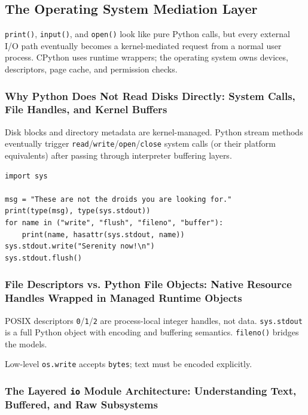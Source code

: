 \subsection{The Operating System Mediation Layer}

\texttt{print()}, \texttt{input()}, and \texttt{open()} look like pure Python calls, but every external I/O path eventually becomes a kernel-mediated request from a normal user process. CPython uses runtime wrappers; the operating system owns devices, descriptors, page cache, and permission checks.

\subsubsection{Why Python Does Not Read Disks Directly: System Calls, File Handles, and Kernel Buffers}

Disk blocks and directory metadata are kernel-managed. Python stream methods eventually trigger \texttt{read}/\texttt{write}/\texttt{open}/\texttt{close} system calls (or their platform equivalents) after passing through interpreter buffering layers.

\begin{verbatim}
import sys

msg = "These are not the droids you are looking for."
print(type(msg), type(sys.stdout))
for name in ("write", "flush", "fileno", "buffer"):
    print(name, hasattr(sys.stdout, name))
sys.stdout.write("Serenity now!\n")
sys.stdout.flush()
\end{verbatim}

\subsubsection{File Descriptors vs. Python File Objects: Native Resource Handles Wrapped in Managed Runtime Objects}

POSIX descriptors \texttt{0}/\texttt{1}/\texttt{2} are process-local integer handles, not data. \texttt{sys.stdout} is a full Python object with encoding and buffering semantics. \texttt{fileno()} bridges the models.

Low-level \texttt{os.write} accepts \texttt{bytes}; text must be encoded explicitly.

\subsubsection{The Layered \texttt{io} Module Architecture: Understanding Text, Buffered, and Raw Subsystems}

